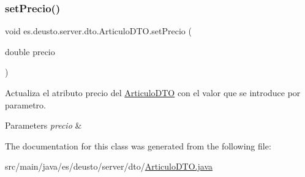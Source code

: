 \subsubsection{\texorpdfstring{setPrecio()}{setPrecio()}}
{\footnotesize\ttfamily void es.\+deusto.\+server.\+dto.\+Articulo\+D\+T\+O.\+set\+Precio (\begin{DoxyParamCaption}\item[{double}]{precio }\end{DoxyParamCaption})}

Actualiza el atributo precio del \mbox{\hyperlink{classes_1_1deusto_1_1server_1_1dto_1_1_articulo_d_t_o}{Articulo\+D\+TO}} con el valor que se introduce por parametro. 
\begin{DoxyParams}{Parameters}
{\em precio} & \\
\hline
\end{DoxyParams}


The documentation for this class was generated from the following file\+:\begin{DoxyCompactItemize}
\item 
src/main/java/es/deusto/server/dto/\mbox{\hyperlink{_articulo_d_t_o_8java}{Articulo\+D\+T\+O.\+java}}\end{DoxyCompactItemize}
